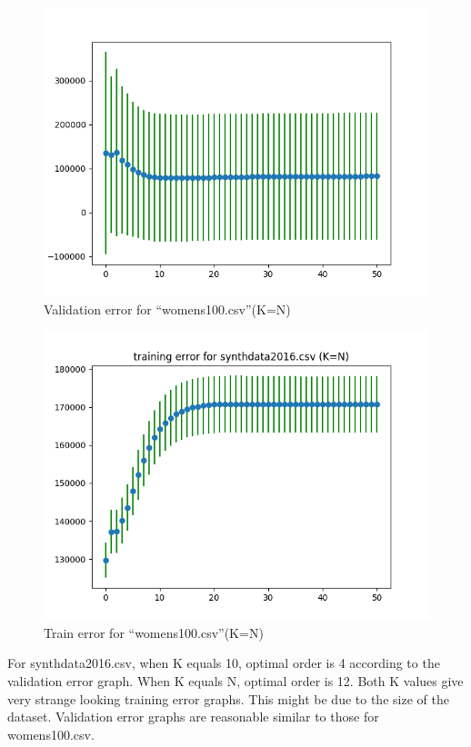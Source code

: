 \documentclass[12pt]{amsart}
\begin{document}
\begin{figure}
    \centering
    \includegraphics[scale=0.7]{K=N_synth.png}
    \caption{Validation error for ``womens100.csv''(K=N)}
    \label{fig:my_label}
\end{figure}
\begin{figure}
    \centering
    \includegraphics[scale=0.7]{K=N_synth_t.png}
    \caption{Train error for ``womens100.csv''(K=N)}
    \label{fig:my_label}
\end{figure}
For synthdata2016.csv, when K equals 10, optimal order is 4 according to the validation error graph. When K equals N, optimal order is 12. Both K values give very strange looking training error graphs. This might be due to the size of the dataset. Validation error graphs are reasonable similar to those for womens100.csv.
\end{document}
